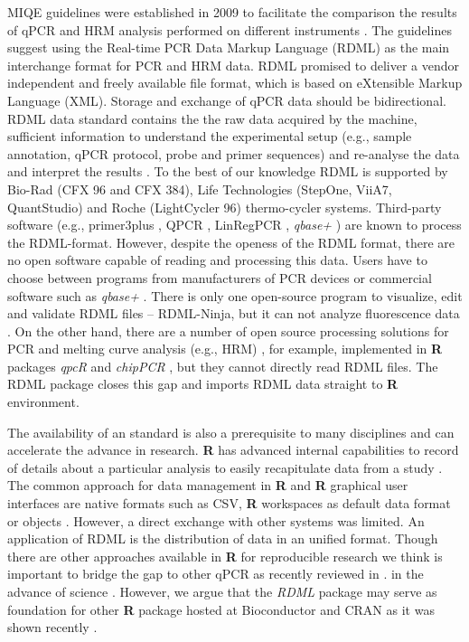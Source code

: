 \documentclass{bioinfo}
\begin{document}
MIQE guidelines were established in 2009 to facilitate the comparison the results of 
qPCR and HRM analysis performed on different instruments \cite{bustin_miqe_2009, huggett_2013}. 
The guidelines suggest using the Real-time PCR Data Markup Language (RDML) as the main 
interchange format for PCR and HRM data. RDML promised to deliver a vendor independent 
and freely available file format, which is based on eXtensible Markup Language (XML). Storage and 
exchange of qPCR data should be bidirectional. RDML data standard contains the 
the raw data acquired by the machine, sufficient information to understand the 
experimental setup (e.g., sample annotation, qPCR protocol, probe and primer 
sequences) and re-analyse the data and interpret the results 
\cite{lefever_rdml:_2009}. To the best of our knowledge RDML is supported by 
Bio-Rad (CFX 96 and CFX 384), Life Technologies (StepOne, ViiA7, QuantStudio) and 
Roche (LightCycler 96) thermo-cycler systems. Third-party software (e.g., 
primer3plus \cite{untergasser_2007}, QPCR \cite{pabinger_2009}, LinRegPCR 
\cite{ruijter_2014}, \textit{qbase+} \cite{hellemans_2007}) are known to process 
the RDML-format. However, despite the openess of the RDML format, there are no 
open software capable of reading and processing this data. Users have to choose between 
programs from manufacturers of PCR devices or commercial software such as \textit{qbase+} 
\cite{rdml}. There is only one open-source program to visualize, edit and validate RDML 
files -- RDML-Ninja, but it can not analyze fluorescence data \cite{rdml-ninja_2015}. 
On the other hand, there are a number of open source processing 
solutions for PCR and melting curve analysis (e.g., HRM) 
\cite{roediger_RJ_2013,cousins_2012}, for example, implemented in \textbf{R} 
packages \textit{qpcR}\cite{ritz_qpcr:_2008} and \textit{chipPCR} 
\cite{rodiger2015chippcr}, but they cannot directly read RDML files. The RDML package 
closes this gap and imports RDML data straight to \textbf{R} environment.

The availability of an standard is also a prerequisite to many disciplines and 
can accelerate the advance in research. \textbf{R} has advanced internal 
capabilities to record of details about a particular analysis to easily 
recapitulate data from a study \cite{liu_2014}. The common approach for data 
management in \textbf{R} and \textbf{R} graphical user interfaces are native 
formats such as CSV, \textbf{R} workspaces as default data format or objects 
\cite{rodiger_rkward_2012, pabinger_2014, RDCT2014c}. However, a direct exchange 
with other systems was limited. An application of RDML is the distribution of 
data in an unified format. Though there are other approaches available in 
\textbf{R} for reproducible research \cite{Leeper_2014} we think is important to 
bridge the gap to other qPCR as recently reviewed in \cite{pabinger_2014}. in 
the advance of science \cite{gentleman_2004}. However, we argue that the 
\textit{RDML} package may serve as foundation for other \textbf{R} package 
hosted at Bioconductor \cite{gentleman_2004} and CRAN \cite{RCT} as it was shown recently \cite{rodiger2015r}. 
\end{document}
